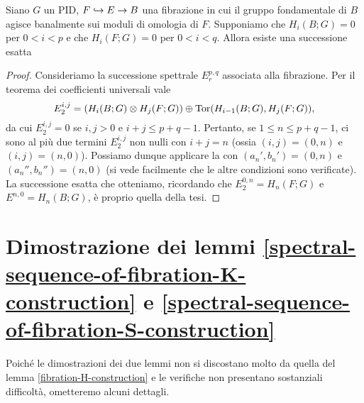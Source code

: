 \begin{proposition}
Siano \(G\) un PID, \(F\hookrightarrow E\to B\) una fibrazione in cui il gruppo fondamentale di \(B\) agisce banalmente sui moduli di omologia di \(F\). Supponiamo che \(H_i(B;G)=0\) per \(0<i<p\) e che \(H_i(F;G)=0\) per \(0<i<q\). Allora esiste una successione esatta
\end{proposition}
\begin{proof}
Consideriamo la successione spettrale \(E^{p,q}_r\) associata alla fibrazione. Per il teorema dei coefficienti universali vale
\[
E^{i,j}_2=(H_i(B;G)\mathbin{\otimes} H_j(F;G))\mathbin{\oplus}\operatorname{Tor}(H_{i-1}(B;G),H_j(F;G)),
\]
da cui \(E^{i,j}_2=0\) se \(i,j>0\) e \(i+j\le p+q-1\). Pertanto, se \(1\le n\le p+q-1\), ci sono al più due termini \(E^{i,j}_2\) non nulli con \(i+j=n\) (ossia \((i,j)=(0,n)\) e \((i,j)=(n,0)\)). Possiamo dunque applicare la  con \((a_n',b_n')=(0,n)\) e \((a_n'',b_n'')=(n,0)\) (si vede facilmente che le altre condizioni sono verificate). La successione esatta che otteniamo, ricordando che \(E^{0,n}_2=H_n(F;G)\) e \(E^{n,0}=H_n(B;G)\), è proprio quella della tesi.
\end{proof}

\section{Dimostrazione dei lemmi \ref{spectral-sequence-of-fibration-K-construction} e \ref{spectral-sequence-of-fibration-S-construction}}\label{spectral-sequence-of-fibration:proofs}
Poiché le dimostrazioni dei due lemmi non si discostano molto da quella del lemma \ref{fibration-H-construction} e le verifiche non presentano sostanziali difficoltà, ometteremo alcuni dettagli.

